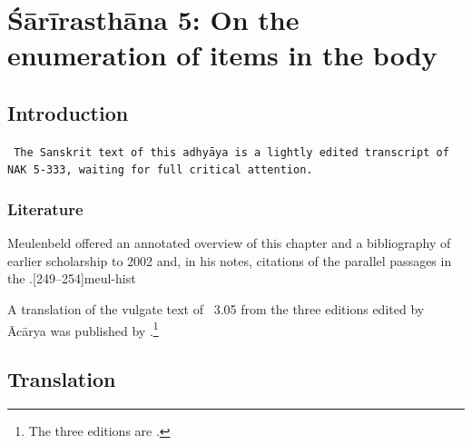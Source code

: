 
\chapter{Śārīrasthāna 5:  On the enumeration of items in the body}


\section{Introduction}

\texttt{%
    The Sanskrit text of this adhyāya is a lightly edited transcript of NAK 5-333,
    waiting for full critical attention.}


\subsection{Literature}

Meulenbeld offered an annotated overview of this chapter and a
bibliography of earlier scholarship to 2002 and, in his notes, citations
of the parallel passages in the \CS.[249--254]{meul-hist}   

A translation of the  vulgate text of \SS\ 3.05 from the three
editions edited by Ācārya was published by
\citet[697--705]{zysk-1986}.\footnote{The three editions are
    \cite{susr-trikamji1,susr-trikamji2,susr-trikamji1945}.}

\newpage

\section{Translation}

\begin{translation}
    \item[1]


\end{translation}